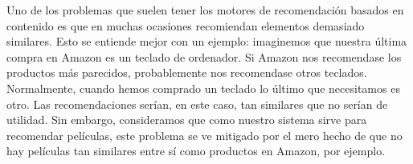 Uno de los problemas que suelen tener los motores de recomendación basados en contenido es que en muchas ocasiones recomiendan elementos demasiado similares. Esto se entiende mejor con un ejemplo: imaginemos que nuestra última compra en Amazon es un teclado de ordenador. Si Amazon nos recomendase los productos más parecidos, probablemente nos recomendase otros teclados. Normalmente, cuando hemos comprado un teclado lo último que necesitamos es otro. Las recomendaciones serían, en este caso, tan similares que no serían de utilidad. Sin embargo, consideramos que como nuestro sistema sirve para recomendar películas, este problema se ve mitigado por el mero hecho de que no hay películas tan similares entre sí como productos en Amazon, por ejemplo.


    
